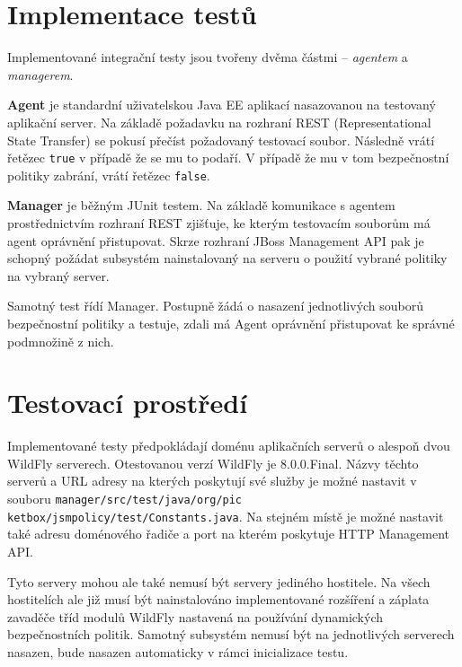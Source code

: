 \section{Implementace testů} %

Implementované integrační testy jsou tvořeny dvěma částmi -- {\it agentem} a {\it managerem}.

{\bf Agent} je standardní uživatelskou Java EE aplikací nasazovanou na testovaný aplikační server. Na základě požadavku na rozhraní REST (Representational State Transfer) se pokusí přečíst požadovaný testovací soubor. Následně vrátí řetězec {\tt true} v případě že se mu to podaří. V případě že mu v tom bezpečnostní politiky zabrání, vrátí řetězec {\tt false}.

{\bf Manager} je běžným JUnit testem. Na základě komunikace s agentem prostřednictvím rozhraní REST zjišťuje, ke kterým testovacím souborům má agent oprávnění přistupovat. Skrze rozhraní JBoss Management API pak je schopný požádat subsystém nainstalovaný na serveru o použití vybrané politiky na vybraný server.

Samotný test řídí Manager. Postupně žádá o nasazení jednotlivých souborů bezpečnostní politiky a testuje, zdali má Agent oprávnění přistupovat ke správné podmnožině z nich.

\section{Testovací prostředí} %

Implementované testy předpokládají doménu aplikačních serverů o alespoň dvou WildFly serverech. Otestovanou verzí WildFly je 8.0.0.Final.
Názvy těchto serverů a URL adresy na kterých poskytují své služby je možné nastavit v souboru {\tt manager/src/test/java/org/pic ketbox/jsmpolicy/test/Constants.java}. Na stejném místě je možné nastavit také adresu doménového řadiče a port na kterém poskytuje HTTP Management API.

Tyto servery mohou ale také nemusí být servery jediného hostitele. Na všech hostitelích ale již musí být nainstalováno implementované rozšíření a záplata zavaděče tříd modulů WildFly nastavená na používání dynamických bezpečnostních politik. Samotný subsystém nemusí být na jednotlivých serverech nasazen, bude nasazen automaticky v rámci inicializace testu.


